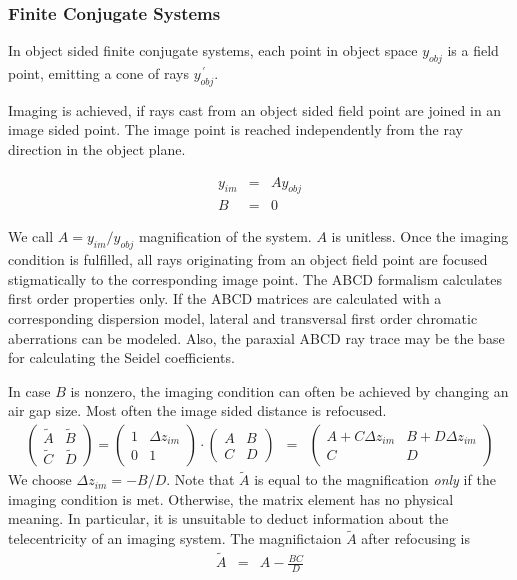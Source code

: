 \documentclass[12pt,a4paper,twoside,openright,BCOR10mm,headsepline,titlepage,abstracton,chapterprefix,final]{scrreprt}
\begin{document}
\subsubsection{Finite Conjugate Systems}
In object sided finite conjugate systems, each point in object space $y_{obj}$ is a field point, 
emitting a cone of rays $y_{obj}^{\,\prime}$.

Imaging is achieved, if rays cast from an object sided field point are joined in an image sided point.
The image point is reached independently from the ray direction in the object plane.

\begin{eqnarray}
   y_{im} &=& A y_{obj} \\
   B &=& 0
\end{eqnarray}

We call $A = y_{im} / y_{obj}$ magnification of the system.
$A$ is unitless.
Once the imaging condition is fulfilled, all rays originating from an object field point are focused stigmatically to the corresponding image point. 
The ABCD formalism calculates first order properties only.
If the ABCD matrices are calculated with a corresponding dispersion model, lateral and transversal first order chromatic aberrations can be modeled.
Also, the paraxial ABCD ray trace may be the base for calculating the Seidel coefficients.

In case $B$ is nonzero, the imaging condition can often be achieved by changing an air gap size. Most often the image sided distance is refocused.
\begin{eqnarray}
 \begin{pmatrix}
  \tilde{A} & \tilde{B} \\ \tilde{C} & \tilde{D}
 \end{pmatrix}
 =
 \begin{pmatrix}
  1 & \Delta z_{im} \\ 0 & 1
 \end{pmatrix}
 \cdot
 \begin{pmatrix}
  A & B \\ C & D
 \end{pmatrix}
 &=&
  \begin{pmatrix}
  A + C \Delta z_{im} & B + D \Delta z_{im} \\ C & D
 \end{pmatrix}
 \label{eq:abcd_refocusing}
\end{eqnarray}
We choose $\Delta z_{im} = - B / D $. Note that $\tilde{A}$ is equal to the magnification \emph{only} if the imaging condition is met. 
Otherwise, the matrix element has no physical meaning.
In particular, it is unsuitable to deduct information about the telecentricity of an imaging system.
The magnifictaion $\tilde{A}$ after refocusing is
\begin{eqnarray}
 \tilde{A} &=& A - \frac{BC}{D}
\end{eqnarray}
\end{document}
